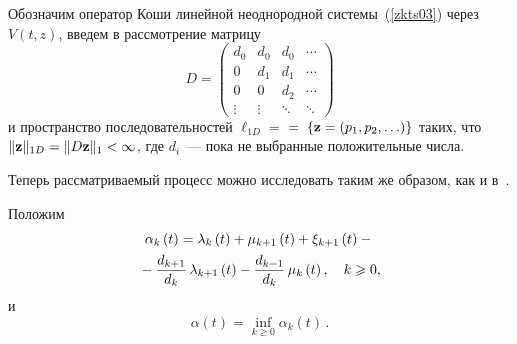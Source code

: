 \begin{multicols}{2}

\noindent
Обозначим оператор Коши линейной неоднородной системы~(\ref{zkts03}) через~ $V(t,z)$, введем в рассмотрение матрицу
\begin{equation*}
  D=
  \begin{pmatrix}
  d_0 & d_0 & d_0 & \cdots \\
  0   & d_1 & d_1 & \cdots \\
  0   & 0   & d_2 & \cdots \\
  \vdots & \vdots & \ddots & \ddots
\end{pmatrix}
\end{equation*}
\noindent и пространство последовательностей
$\ell_{1D}=$\linebreak
$=\;\left\{{\bf z} =(p_1,p_2,\ldots)\right\}$ таких, что $\|{\bf z}\|_{1D}=\|D{\bf
z}\|_1<\infty$, где  $d_i$~--- пока не выбранные положительные числа.

Теперь рассматриваемый процесс можно исследовать таким же образом, как и в~\cite{z09}.


\medskip

Положим
\begin{multline*}
\alpha_{k}\left( t\right) = \lambda _k\left( t\right) +\mu_{k+1}\left( t\right) +\xi_{k+1} \left( t\right) -{}\\
{}- \displaystyle\frac{\displaystyle d_{k+1}\mathstrut}{\displaystyle d_k\mathstrut}\,\lambda _{k+1}\left(
t\right) -\displaystyle\frac{\displaystyle d_{k-1}\mathstrut}{\displaystyle d_k\mathstrut}\,\mu _k\left( t\right), \quad k \geqslant 0,
\end{multline*}
и
\begin{equation*}
\alpha\left( t\right) = \inf_{k\geq 0} \alpha_{k}\left( t\right)\,.
\end{equation*}


\end{multicols}
